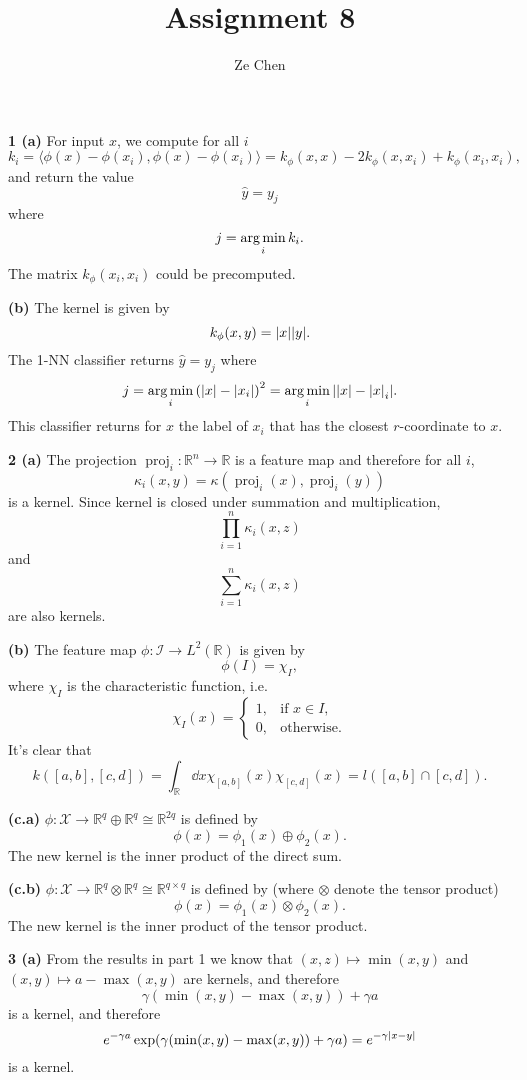\documentclass{article}
\title{Assignment 8}
\author{Ze Chen}
\makeatletter
\newcommand*{\shifttext}[1]{%
  \settowidth{\@tempdima}{#1}%
  \hspace{-\@tempdima}#1%
}
\newcommand{\plabel}[1]{%
\shifttext{\textbf{#1}\quad}%
}
\newcommand{\prule}{%
\begin{center}%
\hdashrule[0.5ex]{.99\linewidth}{1pt}{1pt 2.5pt}%
\end{center}%
}
\makeatother
\begin{document}
\maketitle

\plabel{1 (a)}%
For input $x$, we compute for all $i$
\[ k_i = \langle \phi(x)-\phi(x_i), \phi(x)-\phi(x_i) \rangle = k_\phi(x,x) - 2 k_\phi(x,x_i) + k_\phi(x_i,x_i), \]
and return the value
\[ \hat{y} = y_j \]
where
\[ j = \operatorname*{arg\,min}_i k_i. \]
The matrix $k_\phi(x_i,x_i)$ could be precomputed.

\plabel{(b)}%
The kernel is given by
\[ k_\phi(x, y) = \abs{x} \abs{y}. \]
The 1-NN classifier returns $\hat{y} = y_j$ where
\[ j = \operatorname*{arg\,min}_i \qty(\abs{x} - \abs{x_i})^2 = \operatorname*{arg\,min}_i \abs{\abs{x} - \abs{x}_i}. \]
This classifier returns for $x$ the label of $x_i$ that has the closest $r$-coordinate to $x$.

\prule

\plabel{2 (a)}%
The projection $\operatorname{proj}_i: \mathbb{R}^n \rightarrow \mathbb{R}$ is a feature map and therefore for all $i$,
\[ \kappa_i(x,y) = \kappa(\operatorname{proj}_i (x), \operatorname{proj}_i (y)) \]
is a kernel.
Since kernel is closed under summation and multiplication,
\[ \prod_{i=1}^n \kappa_i(x,z) \]
and
\[ \sum_{i=1}^n \kappa_i(x,z) \]
are also kernels.

\plabel{(b)}%
The feature map $\phi: \mathcal{I} \rightarrow L^2(\mathbb{R})$ is given by
\[ \phi(I) = \chi_I, \]
where $\chi_I$ is the characteristic function, i.e.
\[ \chi_I(x) = \begin{cases}
    1, &\text{if } x\in I, \\
    0, &\text{otherwise}.
\end{cases} \]
It's clear that
\[ k([a,b],[c,d]) = \int_{\mathbb{R}} \dd{x} \chi_{[a,b]}(x) \chi_{[c,d]}(x) = l([a,b]\cap [c,d]). \]

\plabel{(c.a)}%
$\phi:\mathcal{X} \rightarrow \mathbb{R}^q \oplus \mathbb{R}^q \cong \mathbb{R}^{2q}$ is defined by
\[ \phi(x) = \phi_1(x) \oplus \phi_2(x). \]
The new kernel is the inner product of the direct sum.

\plabel{(c.b)}%
$\phi:\mathcal{X} \rightarrow \mathbb{R}^q \otimes \mathbb{R}^q \cong \mathbb{R}^{q\times q}$ is defined by (where $\otimes$ denote the tensor product)
\[ \phi(x) = \phi_1(x) \otimes \phi_2(x). \]
The new kernel is the inner product of the tensor product.

\prule

\plabel{3 (a)}%
From the results in part 1 we know that $(x,z) \mapsto \min(x,y)$ and $(x,y) \mapsto a - \max(x,y)$ are kernels, and therefore
\[ \gamma(\min(x,y) - \max(x,y)) + \gamma a \]
is a kernel, and therefore
\[ e^{-\gamma a}\exp(\gamma(\min(x,y) - \max(x,y)) + \gamma a) = e^{-\gamma\abs{x-y}} \]
is a kernel.
\end{document}
